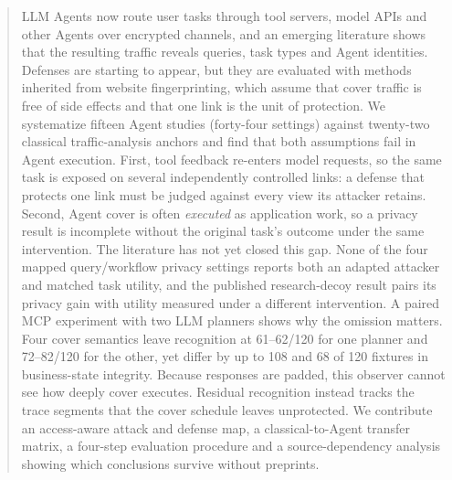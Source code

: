 \begin{abstract}
LLM Agents now route user tasks through tool servers, model APIs and other Agents over encrypted channels, and an emerging literature shows that the resulting traffic reveals queries, task types and Agent identities. Defenses are starting to appear, but they are evaluated with methods inherited from website fingerprinting, which assume that cover traffic is free of side effects and that one link is the unit of protection. We systematize fifteen Agent studies (forty-four settings) against twenty-two classical traffic-analysis anchors and find that both assumptions fail in Agent execution. First, tool feedback re-enters model requests, so the same task is exposed on several independently controlled links: a defense that protects one link must be judged against every view its attacker retains. Second, Agent cover is often \emph{executed} as application work, so a privacy result is incomplete without the original task's outcome under the same intervention. The literature has not yet closed this gap. None of the four mapped query/workflow privacy settings reports both an adapted attacker and matched task utility, and the published research-decoy result pairs its privacy gain with utility measured under a different intervention. A paired MCP experiment with two LLM planners shows why the omission matters. Four cover semantics leave recognition at 61--62/120 for one planner and 72--82/120 for the other, yet differ by up to 108 and 68 of 120 fixtures in business-state integrity. Because responses are padded, this observer cannot see how deeply cover executes. Residual recognition instead tracks the trace segments that the cover schedule leaves unprotected. We contribute an access-aware attack and defense map, a classical-to-Agent transfer matrix, a four-step evaluation procedure and a source-dependency analysis showing which conclusions survive without preprints.
\end{abstract}
